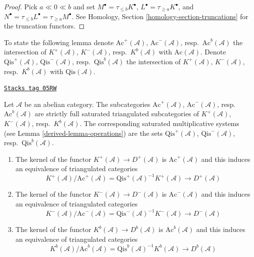 \begin{proof}
Pick $a \ll 0 \ll b$ and set $M^\bullet = \tau_{\leq b}K^\bullet$,
$L^\bullet = \tau_{\geq a}K^\bullet$, and
$N^\bullet = \tau_{\leq b}L^\bullet = \tau_{\geq a}M^\bullet$.
See
Homology, Section \ref{homology-section-truncations}
for the truncation functors.
\end{proof}

To state the following lemma denote
$\text{Ac}^{+}(\mathcal{A})$, $\text{Ac}^{-}(\mathcal{A})$,
resp.\ $\text{Ac}^b(\mathcal{A})$ the intersection of
$K^{+}(\mathcal{A})$, $K^{-}(\mathcal{A})$, resp.\ $K^b(\mathcal{A})$
with $\text{Ac}(\mathcal{A})$.
Denote $\text{Qis}^{+}(\mathcal{A})$, $\text{Qis}^{-}(\mathcal{A})$,
resp.\ $\text{Qis}^b(\mathcal{A})$ the intersection of
$K^{+}(\mathcal{A})$, $K^{-}(\mathcal{A})$, resp.\ $K^b(\mathcal{A})$
with $\text{Qis}(\mathcal{A})$.

\begin{lemma}
\label{derived-lemma-bounded-derived}
\href{https://stacks.math.columbia.edu/tag/05RW}{\texttt{Stacks tag 05RW}}

Let $\mathcal{A}$ be an abelian category. The subcategories
$\text{Ac}^{+}(\mathcal{A})$, $\text{Ac}^{-}(\mathcal{A})$,
resp.\ $\text{Ac}^b(\mathcal{A})$
are strictly full saturated triangulated subcategories
of $K^{+}(\mathcal{A})$, $K^{-}(\mathcal{A})$, resp.\ $K^b(\mathcal{A})$.
The corresponding saturated multiplicative systems (see
Lemma \ref{derived-lemma-operations})
are the sets $\text{Qis}^{+}(\mathcal{A})$, $\text{Qis}^{-}(\mathcal{A})$,
resp.\ $\text{Qis}^b(\mathcal{A})$.
\begin{enumerate}
\item The kernel of the functor $K^{+}(\mathcal{A}) \to D^{+}(\mathcal{A})$
is $\text{Ac}^{+}(\mathcal{A})$ and this induces an equivalence
of triangulated categories
$$
K^{+}(\mathcal{A})/\text{Ac}^{+}(\mathcal{A}) =
\text{Qis}^{+}(\mathcal{A})^{-1}K^{+}(\mathcal{A})
\longrightarrow
D^{+}(\mathcal{A})
$$
\item The kernel of the functor $K^{-}(\mathcal{A}) \to D^{-}(\mathcal{A})$
is $\text{Ac}^{-}(\mathcal{A})$ and this induces an equivalence
of triangulated categories
$$
K^{-}(\mathcal{A})/\text{Ac}^{-}(\mathcal{A}) =
\text{Qis}^{-}(\mathcal{A})^{-1}K^{-}(\mathcal{A})
\longrightarrow
D^{-}(\mathcal{A})
$$
\item The kernel of the functor $K^b(\mathcal{A}) \to D^b(\mathcal{A})$
is $\text{Ac}^b(\mathcal{A})$ and this induces an equivalence
of triangulated categories
$$
K^b(\mathcal{A})/\text{Ac}^b(\mathcal{A}) =
\text{Qis}^b(\mathcal{A})^{-1}K^b(\mathcal{A})
\longrightarrow
D^b(\mathcal{A})
$$
\end{enumerate}
\end{lemma}

